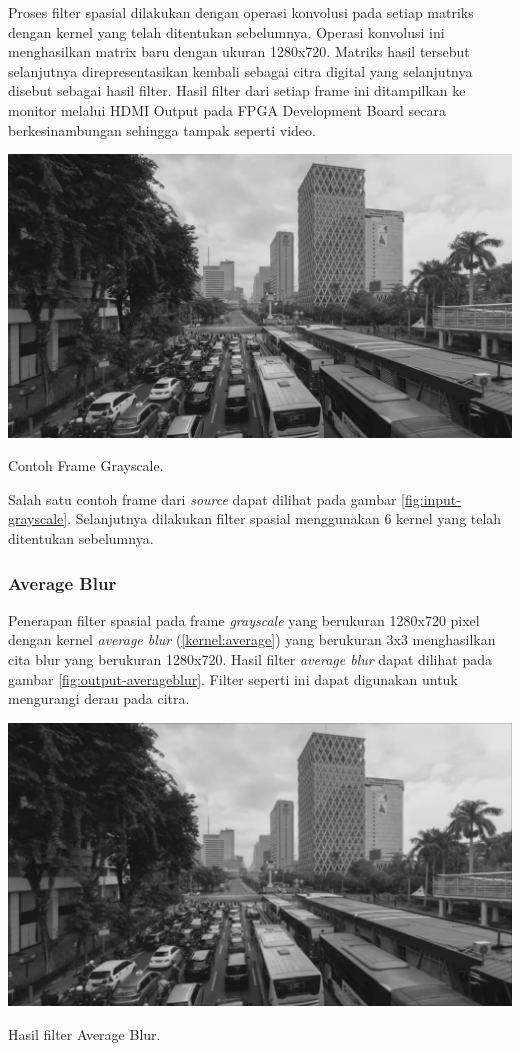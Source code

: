 Proses filter spasial dilakukan dengan operasi konvolusi pada setiap matriks dengan kernel yang telah ditentukan sebelumnya. Operasi konvolusi ini menghasilkan matrix baru dengan ukuran 1280x720. Matriks hasil tersebut selanjutnya direpresentasikan kembali sebagai citra digital yang selanjutnya disebut sebagai hasil filter. Hasil filter dari setiap frame ini ditampilkan ke monitor melalui HDMI Output pada FPGA Development Board secara berkesinambungan sehingga tampak seperti video.

\begin{afigure}
    \includegraphics[width=0.8\linewidth, center]{images/output-image/input1-grayscale.png}
    \caption{Contoh Frame Grayscale.}
    \label{fig:input-grayscale}
\end{afigure}

Salah satu contoh frame dari \textit{source} dapat dilihat pada gambar \ref{fig:input-grayscale}. Selanjutnya dilakukan filter spasial menggunakan 6 kernel yang telah ditentukan sebelumnya.

\subsubsection{Average Blur}
Penerapan filter spasial pada frame \textit{grayscale} yang berukuran 1280x720 pixel dengan kernel \textit{average blur} (\ref{kernel:average}) yang berukuran 3x3 menghasilkan cita blur yang berukuran 1280x720. Hasil filter \textit{average blur} dapat dilihat pada gambar \ref{fig:output-averageblur}. Filter seperti ini dapat digunakan untuk mengurangi derau pada citra.
\begin{afigure}
    \includegraphics[width=0.8\linewidth, center]{images/output-image/input1-averageblur.png}
    \caption{Hasil filter Average Blur.}
    \label{fig:output-averageblur}
\end{afigure}

